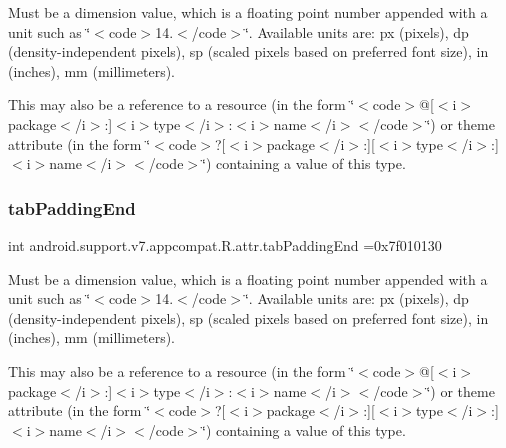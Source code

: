 Must be a dimension value, which is a floating point number appended with a unit such as \char`\"{}$<$code$>$14.\+5sp$<$/code$>$\char`\"{}. Available units are\+: px (pixels), dp (density-\/independent pixels), sp (scaled pixels based on preferred font size), in (inches), mm (millimeters). 

This may also be a reference to a resource (in the form \char`\"{}$<$code$>$@\mbox{[}$<$i$>$package$<$/i$>$\+:\mbox{]}$<$i$>$type$<$/i$>$\+:$<$i$>$name$<$/i$>$$<$/code$>$\char`\"{}) or theme attribute (in the form \char`\"{}$<$code$>$?\mbox{[}$<$i$>$package$<$/i$>$\+:\mbox{]}\mbox{[}$<$i$>$type$<$/i$>$\+:\mbox{]}$<$i$>$name$<$/i$>$$<$/code$>$\char`\"{}) containing a value of this type. \mbox{\label{classandroid_1_1support_1_1v7_1_1appcompat_1_1R_1_1attr_a1e0b501d6627fdcb2f6c08d3eb8efe01}} 
\subsubsection{\texorpdfstring{tab\+Padding\+End}{tabPaddingEnd}}
{\footnotesize\ttfamily int android.\+support.\+v7.\+appcompat.\+R.\+attr.\+tab\+Padding\+End =0x7f010130\hspace{0.3cm}{\ttfamily [static]}}

Must be a dimension value, which is a floating point number appended with a unit such as \char`\"{}$<$code$>$14.\+5sp$<$/code$>$\char`\"{}. Available units are\+: px (pixels), dp (density-\/independent pixels), sp (scaled pixels based on preferred font size), in (inches), mm (millimeters). 

This may also be a reference to a resource (in the form \char`\"{}$<$code$>$@\mbox{[}$<$i$>$package$<$/i$>$\+:\mbox{]}$<$i$>$type$<$/i$>$\+:$<$i$>$name$<$/i$>$$<$/code$>$\char`\"{}) or theme attribute (in the form \char`\"{}$<$code$>$?\mbox{[}$<$i$>$package$<$/i$>$\+:\mbox{]}\mbox{[}$<$i$>$type$<$/i$>$\+:\mbox{]}$<$i$>$name$<$/i$>$$<$/code$>$\char`\"{}) containing a value of this type. \mbox{\label{classandroid_1_1support_1_1v7_1_1appcompat_1_1R_1_1attr_afb55623b8ecb6bc5f717ad08c4878c05}} 

